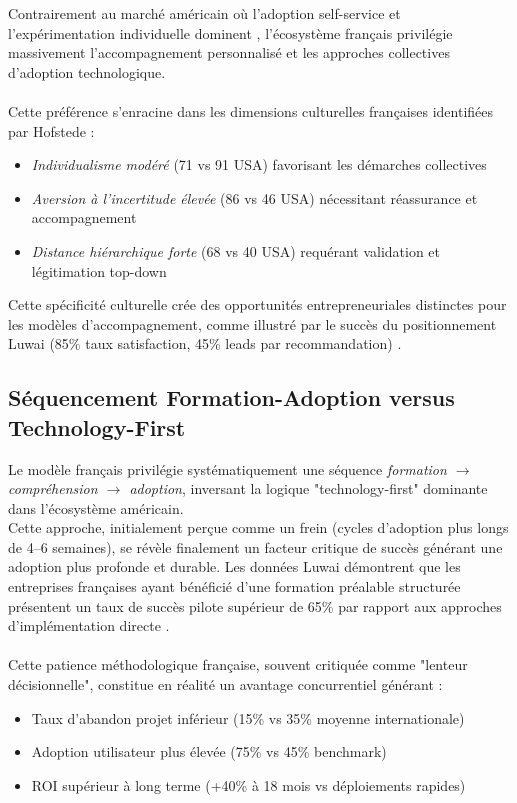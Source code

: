 Contrairement au marché américain où l'adoption self-service et l'expérimentation individuelle dominent \cite{mit2024ai_adoption}, l'écosystème français privilégie massivement l'accompagnement personnalisé et les approches collectives d'adoption technologique.
\\\\
Cette préférence s'enracine dans les dimensions culturelles françaises identifiées par Hofstede :
\begin{itemize}
    \item \emph{Individualisme modéré} (71 vs 91 USA) favorisant les démarches collectives
    \item \emph{Aversion à l'incertitude élevée} (86 vs 46 USA) nécessitant réassurance et accompagnement
    \item \emph{Distance hiérarchique forte} (68 vs 40 USA) requérant validation et légitimation top-down
\end{itemize}
\medskip
Cette spécificité culturelle crée des opportunités entrepreneuriales distinctes pour les modèles d'accompagnement, comme illustré par le succès du positionnement Luwai (85\% taux satisfaction, 45\% leads par recommandation) \cite{hofstede2001culture}.

\subsection{Séquencement Formation-Adoption versus Technology-First}

Le modèle français privilégie systématiquement une séquence \emph{formation $\rightarrow$ compréhension $\rightarrow$ adoption}, inversant la logique "technology-first" dominante dans l'écosystème américain.\\
Cette approche, initialement perçue comme un frein (cycles d'adoption plus longs de 4--6 semaines), se révèle finalement un facteur critique de succès générant une adoption plus profonde et durable. Les données Luwai démontrent que les entreprises françaises ayant bénéficié d'une formation préalable structurée présentent un taux de succès pilote supérieur de 65\% par rapport aux approches d'implémentation directe \cite{luwai2025meetings}.
\\\\
Cette patience méthodologique française, souvent critiquée comme "lenteur décisionnelle", constitue en réalité un avantage concurrentiel générant :
\begin{itemize}
    \item Taux d'abandon projet inférieur (15\% vs 35\% moyenne internationale)
    \item Adoption utilisateur plus élevée (75\% vs 45\% benchmark)
    \item ROI supérieur à long terme (+40\% à 18 mois vs déploiements rapides)
\end{itemize}


